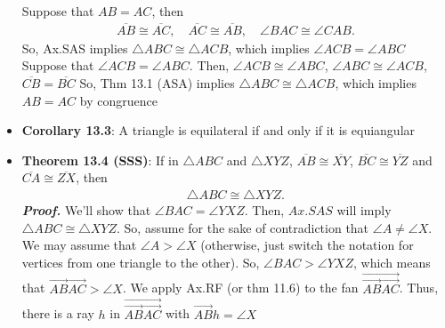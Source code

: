 \documentclass{report}
\begin{document}
\begin{itemize}
            \bigbreak \noindent 
            \begin{figure}[ht]
                \centering
                \label{fig:mig}
            \end{figure}
            \bigbreak \noindent 
            Suppose that $AB = AC$, then 
            \begin{align*}
                \overline{AB} \cong \overline{AC},\quad \overline{AC} \cong \overline{AB}, \quad \angle BAC \cong \angle CAB
            .\end{align*}
            So, Ax.SAS implies $\triangle ABC \cong \triangle ACB $, which implies $ \angle ACB = \angle ABC $
            \bigbreak \noindent 
            Suppose that $\angle ACB = \angle ABC$. Then, $\angle ACB \cong \angle ABC$, $\angle ABC \cong \angle ACB$, $\overline{CB} = \overline{BC} $
            \bigbreak \noindent 
            So, Thm 13.1 (ASA) implies $ \triangle ABC \cong \triangle ACB $, which implies $ AB = AC$ by congruence
        \item \textbf{Corollary 13.3}: A triangle is equilateral if and only if it is equiangular
        \item \textbf{Theorem 13.4 (SSS)}: If in $\triangle ABC$ and $\triangle XYZ$, $\overline{AB} \cong \overline{XY}$, $ \overline{BC} \cong \overline{YZ}$ and $\overline{CA} \cong \overline{ZX}$, then 
            \begin{align*}
                \triangle ABC \cong \triangle XYZ
            .\end{align*}
            \bigbreak \noindent 
            \textbf{\textit{Proof.}} We'll show that $\angle BAC = \angle YXZ$. Then, $Ax.SAS$ will imply $\triangle ABC \cong \triangle XYZ$.
            \bigbreak \noindent 
            So, assume for the sake of contradiction that $ \angle A \ne \angle X$. We may assume that $\angle A > \angle X$ (otherwise, just switch the notation for vertices from one triangle to the other). So, $\angle BAC > \angle YXZ$, which means that $\overrightarrow{AB}\overrightarrow{AC} > \angle X$. We apply Ax.RF (or thm 11.6) to the fan $ \overrightarrow{\overrightarrow{AB}\overrightarrow{AC}} $. Thus, there is a ray $h$ in $\overrightarrow{\overrightarrow{AB}\overrightarrow{AC}} $ with $\overrightarrow{AB}h  = \angle X$
            \bigbreak \noindent 
            \begin{figure}[ht]
                \centering
                \label{fig:anglex}
            \end{figure}

\end{itemize}
\end{document}
